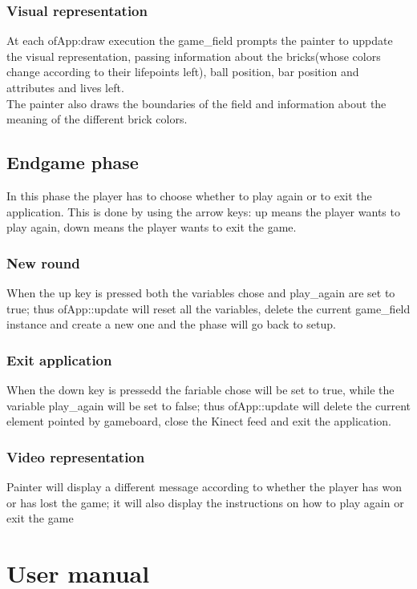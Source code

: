 \documentclass[]{article}
\begin{document}
\subsubsection{Visual representation}
At each ofApp:draw execution the game\_field prompts the painter to uppdate the visual representation, passing information about the bricks(whose colors change according to their lifepoints left), ball position, bar position and attributes and lives left.\\
The painter also draws the boundaries of the field and information about the meaning of the different brick colors.
\newpage
\subsection{Endgame phase}
In this phase the player has to choose whether to play again or to exit the application. This is done by using the arrow keys: up means the player wants to play again, down means the player wants to exit the game.
\subsubsection{New round}
When the up key is pressed both the variables chose and play\_again are set to true; thus ofApp::update will reset all the variables, delete the current game\_field instance and create a new one and the phase will go back to setup.
\subsubsection{Exit application}
When the down key is pressedd the fariable chose will be set to true, while the variable play\_again will be set to false; thus ofApp::update will delete the current element pointed by gameboard, close the Kinect feed and exit the application.
\subsubsection{Video representation}
Painter will display a different message according to whether the player has won or has lost the game; it will also display the instructions on how to play again or exit the game  
\newpage
\section{User manual}
\end{document}
